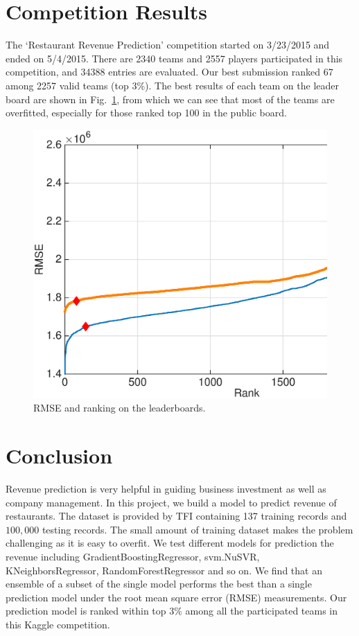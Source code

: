 \documentclass[10pt, oneside]{article}   	%
\newcommand\figref{Fig.~\ref}
\begin{document}
\section{Competition Results}
The `Restaurant Revenue Prediction' competition started on 3/23/2015 and ended on 5/4/2015.
There are 2340 teams and 2557 players participated in this competition, and 34388 entries are evaluated.
Our best submission ranked 67 among 2257 valid teams (top 3\%).
The best results of each team on the leader board are shown in \figref{fig:pb},
from which we can see that most of the teams are overfitted, especially for those ranked top 100 in the public board.

\begin{figure}[h]
   \centering
   \includegraphics[width=4.8in]{figs/pb.eps} 
   \caption{RMSE and ranking on the leaderboards.}
   \label{fig:pb}
\end{figure}



\section{Conclusion} 
Revenue prediction is very helpful in guiding business investment as well as company management. In this project, we build a model to predict revenue of restaurants. The dataset is provided by TFI containing 137 training records and $100,000$ testing records. The small amount of training dataset makes the problem challenging as it is easy to overfit. We test different models for prediction the revenue including GradientBoostingRegressor, svm.NuSVR, KNeighborsRegressor, RandomForestRegressor and so on. We find that an ensemble of a subset of the single model performs the best than a single prediction model under the root mean square error (RMSE) measurements. Our prediction model is ranked within top $3\%$ among all the participated teams in this Kaggle competition.
\end{document}
